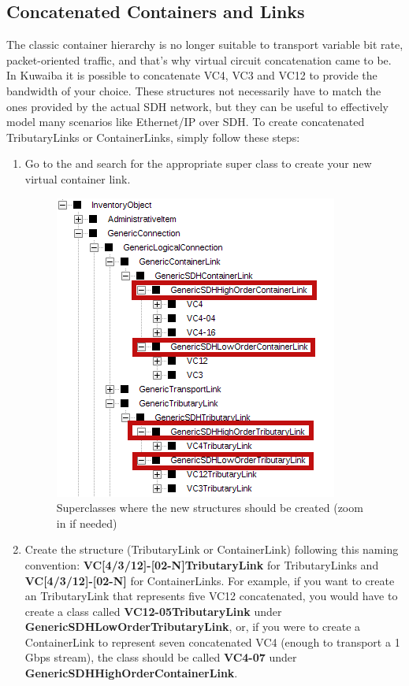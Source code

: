 \documentclass[a4paper]{article}
\begin{document}
		\subsection{Concatenated Containers and Links}
		The classic container hierarchy is no longer suitable to transport variable bit rate, packet-oriented traffic, and that's why virtual circuit concatenation came to be. In Kuwaiba it is possible to concatenate VC4, VC3 and VC12 to provide the bandwidth of your choice. These structures not necessarily have to match the ones provided by the actual SDH network, but they can be useful to effectively model many scenarios like Ethernet/IP over SDH. To create concatenated TributaryLinks or ContainerLinks, simply follow these steps:
		\begin{enumerate}
			\item Go to the  and search for the appropriate super class to create your new virtual container link.
				\begin{figure}[h!]
					\centering
					\includegraphics[width=0.4\linewidth]{img/sdh_module_core_classes.png}
					\caption{Superclasses where the new structures should be created (zoom in if needed)}
					\label{fig:sdh_module_concatenation_superclasses}
				\end{figure}
				\item Create the structure (TributaryLink or ContainerLink) following this naming convention: \textbf{VC[4/3/12]-[02-N]TributaryLink} for TributaryLinks and \textbf{VC[4/3/12]-[02-N]} for ContainerLinks. For example, if you want to create an TributaryLink that represents five VC12 concatenated, you would have to create a class called \textbf{VC12-05TributaryLink} under \textbf{GenericSDHLowOrderTributaryLink}, or, if you were to create a ContainerLink to represent seven concatenated VC4 (enough to transport a 1 Gbps stream), the class should be called \textbf{VC4-07} under \textbf{GenericSDHHighOrderContainerLink}.
				 

\end{enumerate}
\end{document}

